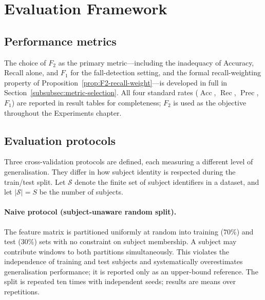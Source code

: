 \documentclass[onluarkali,ingilizce,yukseklisans,karton,LisansustuEgitim]{itutez}
\DeclareMathOperator{\Rec}{Rec}
\DeclareMathOperator{\Prec}{Prec}
\DeclareMathOperator{\Acc}{Acc}
\providecommand{\1}{\mathbf{1}}
\providecommand{\Sset}{\mathcal{S}}
\begin{document}
\section{Evaluation Framework}
\label{subsec:eval_framework}

\subsection{Performance metrics}
\label{subsubsec:metric}

The choice of $F_2$ as the primary metric---including the inadequacy of Accuracy, Recall alone, and $F_1$ for the fall-detection setting, and the formal recall-weighting property of Proposition~\ref{prop:F2-recall-weight}---is developed in full in Section~\ref{subsubsec:metric-selection}. All four standard rates ($\Acc$, $\Rec$, $\Prec$, $F_1$) are reported in result tables for completeness; $F_2$ is used as the objective throughout the Experiments chapter.

\subsection{Evaluation protocols}
\label{subsubsec:protocols}

Three cross-validation protocols are defined, each measuring a different level of generalisation. They differ in how subject identity is respected during the train/test split. Let $\Sset$ denote the finite set of subject identifiers in a dataset, and let $|\Sset|=S$ be the number of subjects.

\paragraph{Naive protocol (subject-unaware random split).}
The feature matrix is partitioned uniformly at random into training ($70\%$) and test ($30\%$) sets with no constraint on subject membership. A subject may contribute windows to both partitions simultaneously. This violates the independence of training and test subjects and systematically overestimates generalisation performance; it is reported only as an upper-bound reference. The split is repeated ten times with independent seeds; results are means over repetitions.
\end{document}
